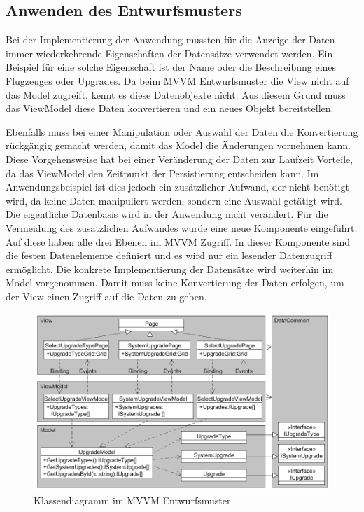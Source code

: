 \subsection{Anwenden des Entwurfsmusters}
Bei der Implementierung der Anwendung mussten für die Anzeige der Daten immer wiederkehrende Eigenschaften der Datensätze verwendet werden. Ein Beispiel für eine solche Eigenschaft ist der Name oder die Beschreibung eines Flugzeuges oder Upgrades. Da beim MVVM Entwurfsmuster die View nicht auf das Model zugreift, kennt es diese Datenobjekte nicht. Aus diesem Grund muss das ViewModel diese Daten konvertieren und ein neues Objekt bereitstellen. 

Ebenfalls muss bei einer Manipulation oder Auswahl der Daten die Konvertierung rückgängig gemacht werden, damit das Model die Änderungen vornehmen kann. Diese Vorgehensweise hat bei einer Veränderung der Daten zur Laufzeit Vorteile, da das ViewModel den Zeitpunkt der Persistierung entscheiden kann. Im Anwendungsbeispiel ist dies jedoch ein zusätzlicher Aufwand, der nicht benötigt wird, da keine Daten manipuliert werden, sondern eine Auswahl getätigt wird. Die eigentliche Datenbasis wird in der Anwendung nicht verändert.
Für die Vermeidung des zusätzlichen Aufwandes wurde eine neue Komponente eingeführt. Auf diese haben alle drei Ebenen im MVVM Zugriff. In dieser Komponente sind die festen Datenelemente definiert und es wird nur ein lesender Datenzugriff ermöglicht. Die konkrete Implementierung der Datensätze wird weiterhin im Model vorgenommen. Damit muss keine Konvertierung der Daten erfolgen, um der View einen Zugriff auf die Daten zu geben. \par 
\begin{figure}
\centering
\includegraphics[width=\hsize]{images/uml_diagramm}
\caption{Klassendiagramm im MVVM Entwurfsmuster}
\label{mvvmApp}
\end{figure}
